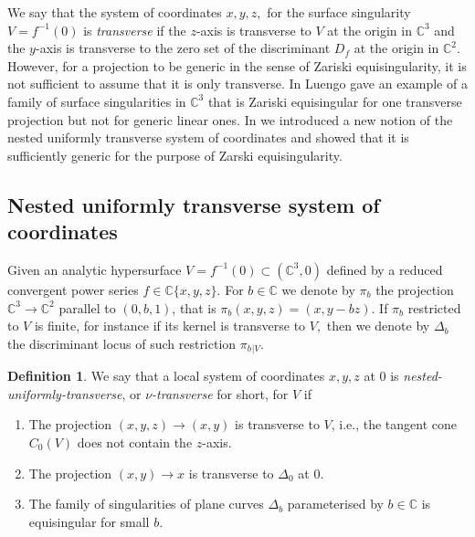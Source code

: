 \documentclass[11pt,a4paper]{amsart}
\newcommand{\1}{{1\!\!1}}
\numberwithin{equation}{section}
\theoremstyle{plain}%
\theoremstyle{definition}
\theoremstyle{definition}
\newtheorem{defn}[thm]{Definition}
\theoremstyle{remark}
\newcommand{\C}{\mathbb{C}}
\renewcommand{\1}{\mathbf{1}}
\newcommand{\inv}{^{-1}}
\newcommand{\snt}{$\nu$-transverse}
\begin{document}
We say that the system of coordinates $x,y,z,$ for the surface singularity 
$V=f\inv(0)$ is \emph{transverse}  if the $z$-axis is transverse to $V$ at the origin in $\C^3$ and the $y$-axis is transverse to the 
zero set of the discriminant $D_f$ at the origin in $\C^2$. 
However, for a projection to be generic in the sense of Zariski equisingularity, it is not sufficient to assume that it is only transverse. In \cite{luengo85} Luengo gave an example of a family of surface 
singularities in $\C^3$ that is Zariski equisingular for one transverse 
projection but not for generic linear ones. 
In \cite{PP24} we introduced a new notion of the nested uniformly transverse system of coordinates and showed that it is sufficiently generic for the purpose of Zarski equisingularity.  




\subsection{Nested uniformly transverse system of coordinates}\label{ssec:newnut}
Given  an analytic hypersurface $V = f^{-1} (0) \subset (\C^3,0 )$ defined by a reduced convergent power series $f\in \C\{x,y,z\}$.  
 For $b\in \C$ we denote by $\pi_b$ the projection 
$\C^3\to \C^ 2$ parallel to $(0,b,1)$, that is $\pi_b(x,y,z) = (x, y-bz)$.  
If $\pi_b$   restricted to $V$ is finite, for instance if its kernel is transverse to $V,$
then we denote by $\Delta_b$ the discriminant locus of such restriction $\pi_b{_{|V}}$.   


\begin{defn} \label{defn:newsnt-generic}
We say that a local  system of coordinates $x,y,z$ at $0$
is \emph{nested-uniformly-transverse}, or \emph{\snt} for 
short, for $V$  if 
\begin{enumerate}
\item
The projection $(x,y,z) \to (x,y) $ is transverse to $V$, i.e., the tangent  cone $C_0(V)$  does not contain the $z$-axis. 
  \item
 The projection $(x,y) \to x $ is transverse to $\Delta_0$ at $0$.
 \item 
The family of singularities of plane curves $\Delta_b$ parameterised by 
 $b\in \C$ is equisingular for small $b$.  
\end{enumerate}   
\end{defn}
 
\end{document}
